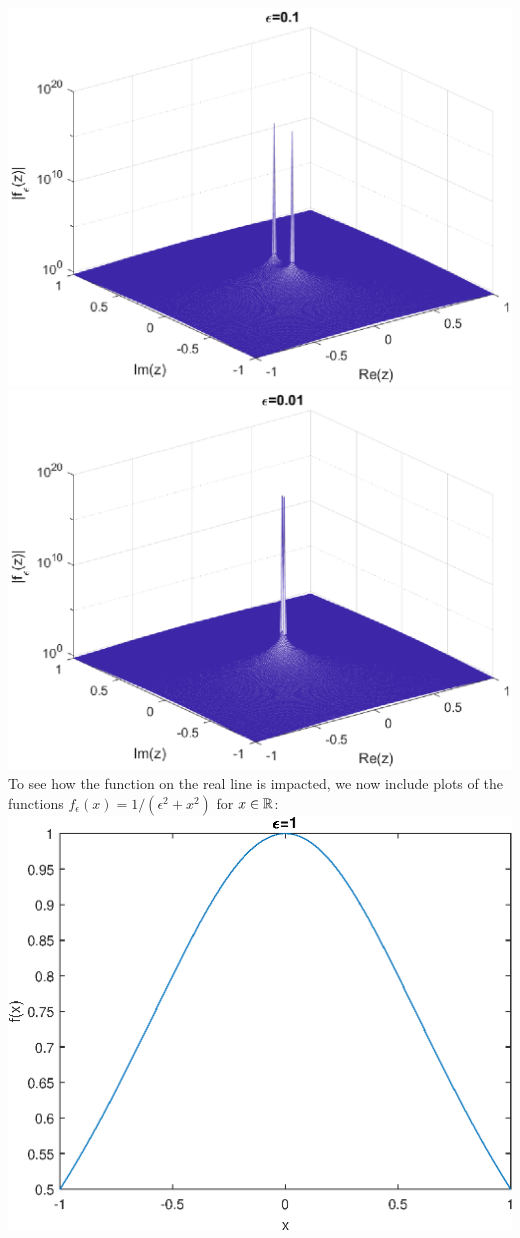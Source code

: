 \documentclass{article}
\begin{document}
\includegraphics[scale=0.55]{3.eps}
\includegraphics[scale=0.55]{4.eps}\\
To see how the function on the real line is impacted, we now include plots of the functions $f_\epsilon(x)=1/(\epsilon^2+x^2)$ for $x\in\mathbb{R}$:\\
\includegraphics[scale=0.55]{real1.eps}
\end{document}
